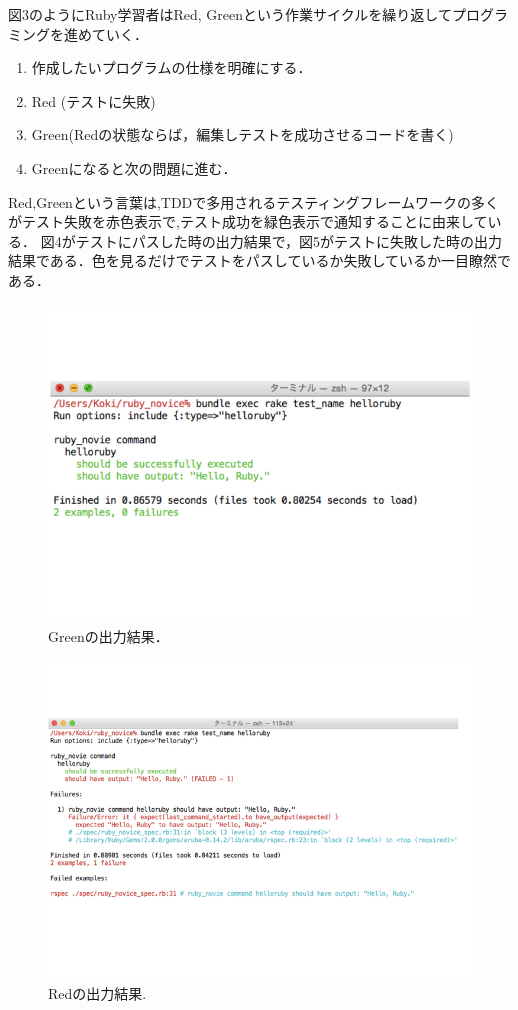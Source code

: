 図3のようにRuby学習者はRed, Greenという作業サイクルを繰り返してプログラミングを進めていく．

\begin{enumerate}
\item 作成したいプログラムの仕様を明確にする．
\item Red (テストに失敗)
\item Green(Redの状態ならば，編集しテストを成功させるコードを書く)
\item Greenになると次の問題に進む．
\end{enumerate}
Red,Greenという言葉は,TDDで多用されるテスティングフレームワークの多くがテスト失敗を赤色表示で,テスト成功を緑色表示で通知することに由来している．
図4がテストにパスした時の出力結果で，図5がテストに失敗した時の出力結果である．色を見るだけでテストをパスしているか失敗しているか一目瞭然である．

\begin{figure}[H]\begin{center}
\includegraphics[width=12cm,bb= 0 0 737 553]{../figs/./ruby_novice.004.jpg}
\caption{Greenの出力結果．}
\label{default}\end{center}\end{figure}
\begin{figure}[H]\begin{center}
\includegraphics[width=12cm,bb= 0 0 737 653]{../figs/./ruby_novice.005.jpg}
\caption{Redの出力結果.}
\label{default}\end{center}\end{figure}
